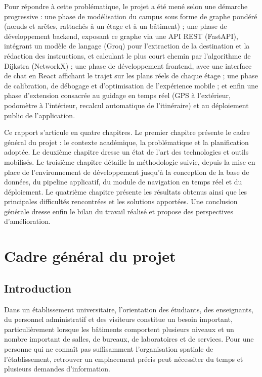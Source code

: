 \documentclass[12pt,a4paper]{report}
\begin{document}
Pour répondre à cette problématique, le projet a été mené selon une démarche progressive : une
phase de modélisation du campus sous forme de graphe pondéré (nœuds et arêtes, rattachés à un
étage et à un bâtiment) ; une phase de développement backend, exposant ce graphe via une API REST
(FastAPI), intégrant un modèle de langage (Groq) pour l'extraction de la destination et la
rédaction des instructions, et calculant le plus court chemin par l'algorithme de Dijkstra
(NetworkX) ; une phase de développement frontend, avec une interface de chat en React affichant
le trajet sur les plans réels de chaque étage ; une phase de calibration, de débogage et
d'optimisation de l'expérience mobile ; et enfin une phase d'extension consacrée au guidage en
temps réel (GPS à l'extérieur, podomètre à l'intérieur, recalcul automatique de l'itinéraire) et
au déploiement public de l'application.

Ce rapport s'articule en quatre chapitres. Le premier chapitre présente le cadre général du
projet : le contexte académique, la problématique et la planification adoptée. Le deuxième
chapitre dresse un état de l'art des technologies et outils mobilisés. Le troisième chapitre
détaille la méthodologie suivie, depuis la mise en place de l'environnement de développement
jusqu'à la conception de la base de données, du pipeline applicatif, du module de navigation en
temps réel et du déploiement. Le quatrième chapitre présente les résultats obtenus ainsi que les
principales difficultés rencontrées et les solutions apportées. Une conclusion générale dresse
enfin le bilan du travail réalisé et propose des perspectives d'amélioration.

\chapter{Cadre général du projet}

\section{Introduction}

Dans un établissement universitaire, l'orientation des étudiants, des enseignants, du personnel
administratif et des visiteurs constitue un besoin important, particulièrement lorsque les
bâtiments comportent plusieurs niveaux et un nombre important de salles, de bureaux, de
laboratoires et de services. Pour une personne qui ne connaît pas suffisamment l'organisation
spatiale de l'établissement, retrouver un emplacement précis peut nécessiter du temps et
plusieurs demandes d'information.
\end{document}

